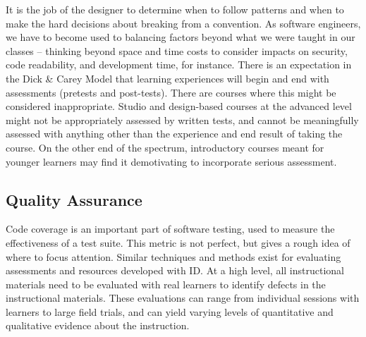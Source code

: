 It is the job of the designer to determine when to follow patterns and when to make the hard decisions about breaking from a convention.
As software engineers, we have to become used to balancing factors beyond what we were taught in our classes -- thinking beyond space and time costs to consider impacts on security, code readability, and development time, for instance.
There is an expectation in the Dick \& Carey Model that learning experiences will begin and end with assessments (pretests and post-tests).
There are courses where this might be considered inappropriate.
Studio and design-based courses at the advanced level might not be appropriately assessed by written tests, and cannot be meaningfully assessed with anything other than the experience and end result of taking the course.
On the other end of the spectrum, introductory courses meant for younger learners may find it demotivating to incorporate serious assessment.


\subsection{Quality Assurance}


Code coverage is an important part of software testing, used to measure the effectiveness of a test suite.
This metric is not perfect, but gives a rough idea of where to focus attention.
Similar techniques and methods exist for evaluating assessments and resources developed with ID.
At a high level, all instructional materials need to be evaluated with real learners to identify defects in the instructional materials.
These evaluations can range from individual sessions with learners to large field trials, and can yield varying levels of quantitative and qualitative evidence about the instruction.

